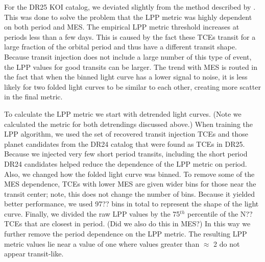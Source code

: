 For the DR25 KOI catalog, we deviated slightly from the method described by \citet{Thompson2015b}.  This was done to solve the problem that the LPP metric was highly dependent on both period and MES. The empirical LPP metric threshold increases at periods less than a few days. This is caused by the fact these TCEs transit for a large fraction of the orbital period and thus have a different transit shape. Because transit injection does not include a large number of this type of event, the LPP values for good transits can be larger.  The trend with MES is routed in the fact that when the binned light curve has a lower signal to noise, it is less likely for two folded light curves to be similar to each other, creating more scatter in the final metric. 

To calculate the LPP metric we start with detrended \kepler{} light curves. (Note we calculated the metric for both detrendings discussed above.)  When training the LPP algorithm, we used the set of recovered transit injection TCEs and those planet candidates from the DR24 catalog \citep{Coughlin2016cat} that were found as TCEs in DR25.  Because we injected very few short period transits, including the short period DR24 candidates helped reduce the dependence of the LPP metric on period.  Also, we changed how the folded light curve was binned. To remove some of the MES dependence, TCEs with lower MES are given wider bins for those near the transit center; note, this does not change the number of bins. Because it yielded better performance, we used 97?? bins in total to represent the shape of the light curve.  Finally, we divided the raw LPP values by the 75$^{th}$ percentile of the N?? TCEs that are closest in period. (Did we also do this in MES?) In this way we further remove the period dependence on the LPP metric.  The resulting LPP metric values lie near a value of one where values greater than $\approx$ 2 do not appear transit-like.  



